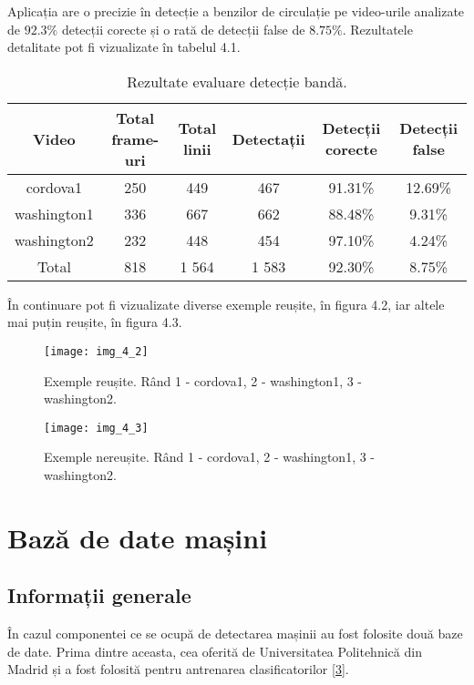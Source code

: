 Aplicația are o precizie în detecție a benzilor de circulație pe video-urile analizate de $92.3\%$ detecții corecte și o rată de detecții false de $8.75\%$. Rezultatele detalitate pot fi vizualizate în tabelul 4.1.

\begin{table}[h!]
	\centering
	\begin{tabular}{||c | c | c | c | c | c ||} 
		\hline
		Video & Total frame-uri & Total linii & Detectații & Detecții corecte & Detecții false \\ [0.5ex] 
		\hline\hline
		cordova1 & 250 & 449 & 467 & 91.31\% & 12.69\%  \\ 
		washington1 & 336 & 667 & 662 & 88.48\% & 9.31\% \\
		washington2 & 232 & 448 & 454 & 97.10\% & 4.24\%  \\ 
		\hline\hline
		Total & 818 & 1 564 & 1 583 & 92.30\% & 8.75\% \\ [1ex]
		 
		\hline
	\end{tabular}
	\caption{Rezultate evaluare detecție bandă.}
	\label{table:1}
\end{table}

În continuare pot fi vizualizate diverse exemple reușite, în figura 4.2, iar altele mai puțin reușite, în figura 4.3.

\begin{figure}[!h]
	\centering
	\texttt{[image: img\_4\_2]}
	\caption[Detecție bandă - exemple reușite]{Exemple reușite. Rând 1 - cordova1, 2 - washington1, 3 - washington2.}
\end{figure}
\begin{figure}[!h]
	\centering
	\texttt{[image: img\_4\_3]}
	\caption[Detecție bandă - exemple nereușite]{Exemple nereușite. Rând 1 - cordova1, 2 - washington1, 3 - washington2.}
\end{figure}

\section{Bază de date mașini}

\subsection*{Informații generale}

În cazul componentei ce se ocupă de detectarea mașinii au fost folosite două baze de date. Prima dintre aceasta, cea oferită de Universitatea Politehnică din Madrid și a fost folosită pentru antrenarea clasificatorilor \hyperlink{BazadedatemasiniUniversitateaPolitehnicadinMadrid}{[3]}.

